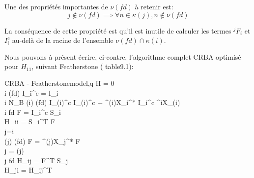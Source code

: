\documentclass{report}
\begin{document}
\setlength{\columnseprule}{0.5pt}
\begin{multicols}{2}\raggedcolumns
\begin{flushleft}
Une des propriétés importantes de $\nu(fd)$ à retenir est:
\begin{equation*}
j \notin \nu(fd) \implies \forall n \in \kappa(j), n \notin \nu(fd)
\end{equation*}

La conséquence de cette propriété est qu'il est inutile de calculer les termes $^jF_i$ et $I_i^c$ au-delà de la racine de l'ensemble $\nu(fd) \cap \kappa(i)$.
\end{flushleft}

Nous pouvons à présent écrire, ci-contre, l'algorithme complet CRBA optimisé pour $H_{11}$, suivant Featherstone (\cite{bib_featherstone} table9.1):\\

    	\begin{spacing}{1.5}
		\begin{pseudocode}{CRBA - Featherstone}{model,q} \label{algo_crbaFeatherstone}
    H = 0 \\
		\FOREACH i \in \nu(fd) \DO
		  I_i^c = I_i \\
		\FOR i \GETS N_B  \DO
		\BEGIN
		  \IF \lambda(i) \in \nu(fd)
		  \THEN
		    I_{\lambda(i)}^c \GETS I_{\lambda(i)}^c + {^{\lambda(i)}X_i^*} \: {I_i^c} \: {^iX_{\lambda(i)}} \\
		  \IF i \in fd \THEN
		  \BEGIN
			  F = {I_i^c} \: S_i \\
			  H_{ii} = {S_i^T} F \\
			  j=i \\
			  \WHILE \lambda(j) \in \nu(fd) \DO
			  \BEGIN
			    F = {^{\lambda(j)}X_j^*} F \\
			    j = \lambda(j) \\
			    \IF j \in fd \THEN
			    \BEGIN
				    H_{ij} = F^T S_j \\
				    H_{ji} = H_{ij}^T
			    \END
			  \END
			\END
		\END
	  \end{pseudocode}
	  \end{spacing}

\end{multicols}
\end{document}
